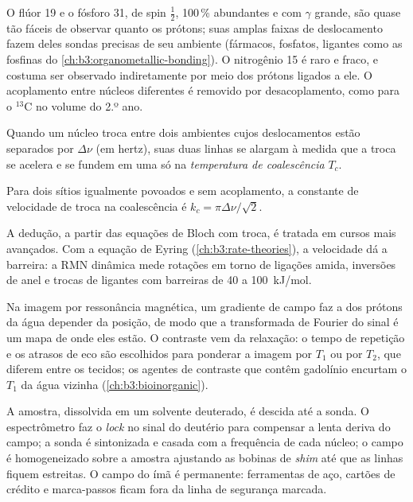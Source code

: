 O flúor 19 e o fósforo 31, de spin $\frac12$, 100\,\% abundantes e com $\gamma$
grande, são quase tão fáceis de observar quanto os prótons; suas amplas faixas de
deslocamento fazem deles sondas precisas de seu ambiente (fármacos, fosfatos,
ligantes como as fosfinas do \cref{ch:b3:organometallic-bonding}). O
nitrogênio 15 é raro e fraco, e costuma ser observado indiretamente por meio
dos prótons ligados a ele. O acoplamento entre núcleos diferentes é removido
por desacoplamento, como para o ${}^{13}$C no volume do 2.º ano.

\begin{definition}\label{def:b3:advanced-nmr:coalescence}
Quando um núcleo troca entre dois ambientes cujos deslocamentos estão separados
por $\Delta\nu$ (em hertz), suas duas linhas se alargam à medida que a troca se
acelera e se fundem em uma só na \emph{temperatura de coalescência}
$T_c$.
\end{definition}

\begin{proposition}\label{prop:b3:advanced-nmr:coalescence}
Para dois sítios igualmente povoados e sem acoplamento, a constante de velocidade
de troca na coalescência é $k_c = \pi\Delta\nu/\sqrt2$.
\end{proposition}
\admitted

A dedução, a partir das equações de Bloch com troca, é tratada em cursos mais
avançados. Com a equação de Eyring (\cref{ch:b3:rate-theories}), a velocidade
dá a barreira: a RMN dinâmica mede rotações em torno de ligações amida,
inversões de anel e trocas de ligantes com barreiras de 40 a \qty{100}{kJ/mol}.

\begin{example}\label{ex:b3:advanced-nmr:mri}
Na imagem por ressonância magnética, um gradiente de campo faz a  dos prótons da água depender da posição, de modo que a transformada
de Fourier do sinal é um mapa de onde eles estão. O contraste vem da relaxação:
o tempo de repetição e os atrasos de eco são escolhidos para ponderar a imagem
por $T_1$ ou por $T_2$, que diferem entre os tecidos; os agentes de contraste que
contêm gadolínio encurtam o $T_1$ da água vizinha (\cref{ch:b3:bioinorganic}).
\end{example}

\begin{inthelab}
A amostra, dissolvida em um solvente deuterado, é descida até a sonda. O
espectrômetro faz o \textit{lock} no sinal do deutério para compensar a lenta
deriva do campo; a sonda é sintonizada e casada com a frequência de cada núcleo;
o campo é homogeneizado sobre a amostra ajustando as bobinas de \textit{shim}
até que as linhas fiquem estreitas. O campo do ímã é permanente: ferramentas de
aço, cartões de crédito e marca-passos ficam fora da linha de segurança marcada.
\end{inthelab}


